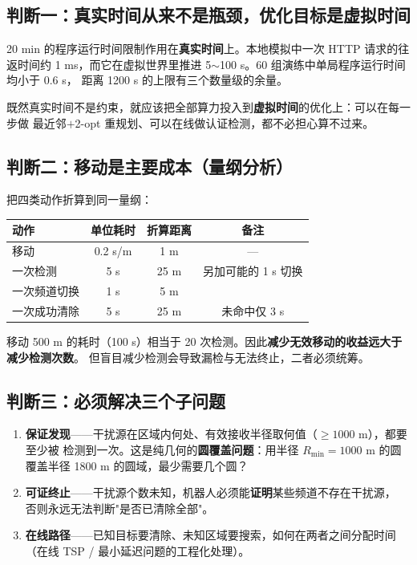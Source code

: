 \subsection{判断一：真实时间从来不是瓶颈，优化目标是虚拟时间}

20 min 的程序运行时间限制作用在\textbf{真实时间}上。本地模拟中一次 HTTP 请求的往返时间约
1 ms，而它在虚拟世界里推进 5$\sim$100 s。60 组演练中单局程序运行时间均小于 0.6 s，
距离 1200 s 的上限有三个数量级的余量。

\begin{keybox}[title=结论]
既然真实时间不是约束，就应该把全部算力投入到\textbf{虚拟时间}的优化上：可以在每一步做
最近邻$+$2-opt 重规划、可以在线做认证检测，都不必担心算不过来。
\end{keybox}

\subsection{判断二：移动是主要成本（量纲分析）}

把四类动作折算到同一量纲：

\begin{center}
\begin{tabular}{lccc}
\toprule
动作 & 单位耗时 & 折算距离 & 备注 \\
\midrule
移动 & 0.2 s/m & 1 m & — \\
一次检测 & 5 s & 25 m & 另加可能的 1 s 切换 \\
一次频道切换 & 1 s & 5 m & \\
一次成功清除 & 5 s & 25 m & 未命中仅 3 s \\
\bottomrule
\end{tabular}
\end{center}

移动 500 m 的耗时（100 s）相当于 20 次检测。因此\textbf{减少无效移动的收益远大于减少检测次数}。
但盲目减少检测会导致漏检与无法终止，二者必须统筹。

\subsection{判断三：必须解决三个子问题}

\begin{enumerate}[leftmargin=1.8em]
  \item \textbf{保证发现}——干扰源在区域内何处、有效接收半径取何值（$\ge1000$ m），都要至少被
        检测到一次。这是纯几何的\textbf{圆覆盖问题}：用半径 $R_{\min}=1000$ m 的圆覆盖半径
        1800 m 的圆域，最少需要几个圆？
  \item \textbf{可证终止}——干扰源个数未知，机器人必须能\textbf{证明}某些频道不存在干扰源，
        否则永远无法判断"是否已清除全部"。
  \item \textbf{在线路径}——已知目标要清除、未知区域要搜索，如何在两者之间分配时间
        （在线 TSP / 最小延迟问题的工程化处理）。
\end{enumerate}

